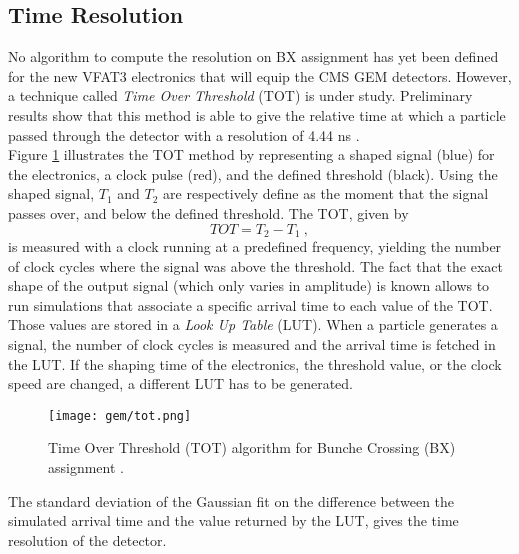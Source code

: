         \subsection{Time Resolution}

            No algorithm to compute the resolution on BX assignment has yet been defined for the new VFAT3 electronics that will equip the CMS GEM detectors. However, a technique called \emph{Time Over Threshold} (TOT) is under study. Preliminary results show that this method is able to give the relative time at which a particle passed through the detector with a resolution of 4.44 ns \Cite{GEM_Thierry_Pres}. \\

            Figure \ref{fig:gas_electron_multiplier_detectors__tot} illustrates the TOT method by representing a shaped signal (blue) for the electronics, a clock pulse (red), and the defined threshold (black). Using the shaped signal, $ T_1 $ and $ T_2 $ are respectively define as the moment that the signal passes over, and below the defined threshold. The TOT, given by
            \begin{equation}
                TOT = T_{2} - T_{1} \ ,
            \end{equation}
            is measured with a clock running at a predefined frequency, yielding the number of clock cycles where the signal was above the threshold. The fact that the exact shape of the output signal (which only varies in amplitude) is known allows to run simulations that associate a specific arrival time to each value of the TOT. Those values are stored in a \emph{Look Up Table} (LUT). When a particle generates a signal, the number of clock cycles is measured and the arrival time is fetched in the LUT. If the shaping time of the electronics, the threshold value, or the clock speed are changed, a different LUT has to be generated. \\

            \begin{figure}[h!]
                \centering
                \texttt{[image: gem/tot.png]}
                \caption{Time Over Threshold (TOT) algorithm for Bunche Crossing (BX) assignment \Cite{GEM_Thierry_Pres}.}
                \label{fig:gas_electron_multiplier_detectors__tot}
            \end{figure}    

            The standard deviation of the Gaussian fit on the difference between the simulated arrival time and the value returned by the LUT, gives the time resolution of the detector.

